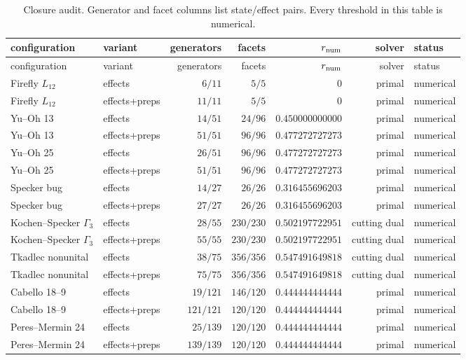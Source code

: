\documentclass[11pt]{article}
\begin{document}
\begin{landscape}
\footnotesize
\setlength{\tabcolsep}{3pt}
\begin{longtable}{p{38mm}p{27mm}rrrrl}
\caption{Closure audit.  Generator and facet columns list state/effect pairs.
Every threshold in this table is numerical.}
\label{tab:closures}\\
\toprule
configuration & variant & generators & facets & $r_{\rm num}$ & solver & status\\
\midrule
\endfirsthead
\toprule
configuration & variant & generators & facets & $r_{\rm num}$ & solver & status\\
\midrule
\endhead
Firefly $L_{12}$ & effects & $6/11$ & $5/5$ & $0$ & primal & numerical\\
Firefly $L_{12}$ & effects+preps & $11/11$ & $5/5$ & $0$ & primal & numerical\\
Yu--Oh 13 & effects & $14/51$ & $24/96$ & $0.450000000000$ & primal & numerical\\
Yu--Oh 13 & effects+preps & $51/51$ & $96/96$ & $0.477272727273$ & primal & numerical\\
Yu--Oh 25 & effects & $26/51$ & $96/96$ & $0.477272727273$ & primal & numerical\\
Yu--Oh 25 & effects+preps & $51/51$ & $96/96$ & $0.477272727273$ & primal & numerical\\
Specker bug & effects & $14/27$ & $26/26$ & $0.316455696203$ & primal & numerical\\
Specker bug & effects+preps & $27/27$ & $26/26$ & $0.316455696203$ & primal & numerical\\
Kochen--Specker $\Gamma_3$ & effects & $28/55$ & $230/230$ & $0.502197722951$ & cutting dual & numerical\\
Kochen--Specker $\Gamma_3$ & effects+preps & $55/55$ & $230/230$ & $0.502197722951$ & cutting dual & numerical\\
Tkadlec nonunital & effects & $38/75$ & $356/356$ & $0.547491649818$ & cutting dual & numerical\\
Tkadlec nonunital & effects+preps & $75/75$ & $356/356$ & $0.547491649818$ & cutting dual & numerical\\
Cabello 18--9 & effects & $19/121$ & $146/120$ & $0.444444444444$ & primal & numerical\\
Cabello 18--9 & effects+preps & $121/121$ & $120/120$ & $0.444444444444$ & primal & numerical\\
Peres--Mermin 24 & effects & $25/139$ & $120/120$ & $0.444444444444$ & primal & numerical\\
Peres--Mermin 24 & effects+preps & $139/139$ & $120/120$ & $0.444444444444$ & primal & numerical\\
\bottomrule
\end{longtable}
\end{landscape}
\end{document}
